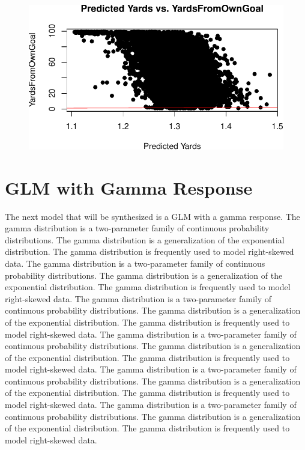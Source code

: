 \documentclass[
  super,
  preprint,
  3p]{elsarticle}
\begin{document}
\begin{figure}[H]

{\centering \includegraphics{project_report_files/figure-pdf/unnamed-chunk-24-1.pdf}

}

\end{figure}

\hypertarget{glm-with-gamma-response}{%
\section{GLM with Gamma Response}\label{glm-with-gamma-response}}

The next model that will be synthesized is a GLM with a gamma response.
The gamma distribution is a two-parameter family of continuous
probability distributions. The gamma distribution is a generalization of
the exponential distribution. The gamma distribution is frequently used
to model right-skewed data. The gamma distribution is a two-parameter
family of continuous probability distributions. The gamma distribution
is a generalization of the exponential distribution. The gamma
distribution is frequently used to model right-skewed data. The gamma
distribution is a two-parameter family of continuous probability
distributions. The gamma distribution is a generalization of the
exponential distribution. The gamma distribution is frequently used to
model right-skewed data. The gamma distribution is a two-parameter
family of continuous probability distributions. The gamma distribution
is a generalization of the exponential distribution. The gamma
distribution is frequently used to model right-skewed data. The gamma
distribution is a two-parameter family of continuous probability
distributions. The gamma distribution is a generalization of the
exponential distribution. The gamma distribution is frequently used to
model right-skewed data. The gamma distribution is a two-parameter
family of continuous probability distributions. The gamma distribution
is a generalization of the exponential distribution. The gamma
distribution is frequently used to model right-skewed data.
\end{document}
